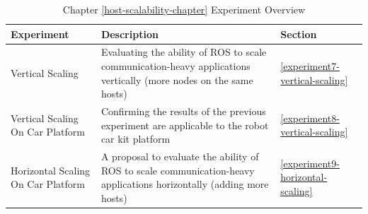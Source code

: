 \documentclass{l4proj}
\begin{document}
\begin{table}[H]
    \centering
        \caption{Chapter \ref{host-scalability-chapter} Experiment Overview}
        \label{chapter-4-experiment-overview}
        \begin{tabular}{|p{}|p{}|p{}|}
            \hline
            \textbf{Experiment}                & \textbf{Description}                                                                                                 & \textbf{Section}                       \\ \hline
            Vertical Scaling                   & Evaluating the ability of ROS to scale communication-heavy applications vertically (more nodes on the same hosts)    & \ref{experiment7-vertical-scaling}   \\ \hline
            Vertical Scaling On Car Platform   & Confirming the results of the previous experiment are applicable to the robot car kit platform                       & \ref{experiment8-vertical-scaling}   \\ \hline
            Horizontal Scaling On Car Platform & A proposal to evaluate the ability of ROS to scale communication-heavy applications horizontally (adding more hosts) & \ref{experiment9-horizontal-scaling} \\ \hline
        \end{tabular}
\end{table}










\end{document}

